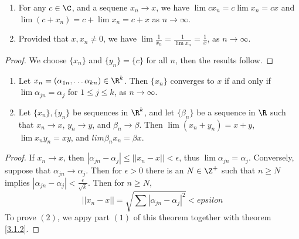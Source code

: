 \begin{corollary}
    \begin{enumerate}[label=(\arabic*)]
        \item For any $c \in \C$, and a sequene  $x_n \rightarrow x$, we have  $\lim{cx_n}=
            c\lim{x_n}=cx$ and  $\lim{(c+x_n)}=c+\lim{x_n}=c+x$ as $n \rightarrow \infty$.

        \item Provided that  $x,x_n \neq 0$, we have  $\lim{\frac{1}{x_n}}=\frac{1}{\lim{x_n}}=\frac{1}{x}$, 
            as $n \rightarrow \infty$.
    \end{enumerate}
\end{corollary}
\begin{proof}
    We choose $\{x_n\}$ and  $\{y_n\}=\{c\}$ for all  $n$, then the results follow.		
\end{proof}

\begin{theorem}\label{3.1.3}
    \begin{enumerate}[label=(\arabic*)]
        \item Let $x_n=(\alpha_{1n}, \dots \alpha_{kn}) \in \R^k$. Then $\{x_n\}$ converges to  $x$ 
            if and only if $\lim{\alpha_{jn}}=\alpha_j$ for  $1 \leq j \leq k$, as  $n \rightarrow \infty$.

        \item Let  $\{x_n\},\{y_n\}$ be sequences in  $\R^k$, and let  $\{\beta_n\}$ be a 
            sequence in  $\R$  such that $x_n \rightarrow x$,  $y_n \rightarrow y$, and  $\beta_n \rightarrow \beta$. Then 
        $\lim{(x_n+y_n)}=x+y$, $\lim{x_ny_n}=xy$, and  $lim{\beta_nx_n}=\beta x$.
    \end{enumerate}
\end{theorem}
\begin{proof}
    If $x_n \rightarrow x$, then  $|\alpha_{jn}-\alpha_j| \leq ||x_n-x||<\epsilon$, thus $\lim{\alpha_{jn}}=\alpha_j$. Conversely, 
    suppose that $\alpha_{jn} \rightarrow \alpha_j$. Then for $\epsilon>0$ there is an $N \in \Z^+$ such that 
    $n \geq N$ implies $|\alpha_{jn}-\alpha_j|<\frac{\epsilon}{\sqrt{k}}$. Then for $n \geq N$, 
        \begin{equation*}
            ||x_n-x||=\sqrt{\sum{|\alpha_{jn}-\alpha_j|^2}}<epsilon
        \end{equation*}
        To prove $(2)$, we appy part $(1)$ of this theorem together with theorem \ref{3.1.2}.
\end{proof}

